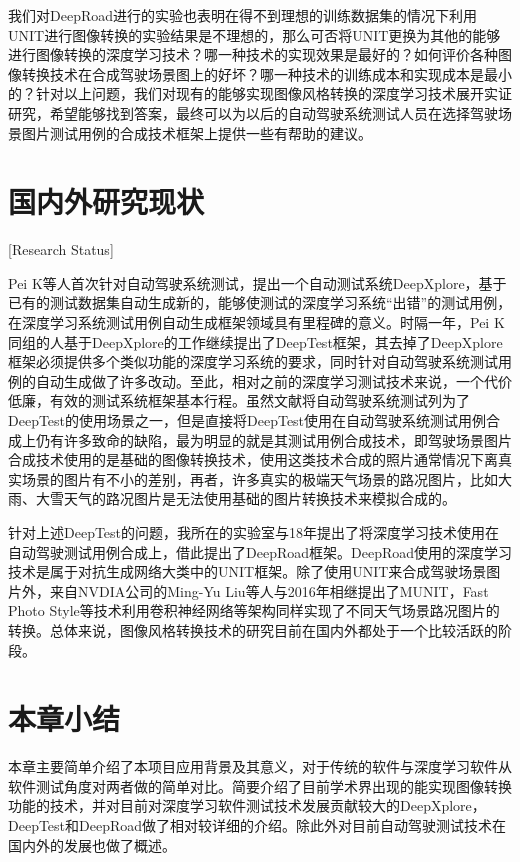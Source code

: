 我们对DeepRoad进行的实验也表明在得不到理想的训练数据集的情况下利用UNIT进行图像转换的实验结果是不理想的，那么可否将UNIT更换为其他的能够进行图像转换的深度学习技术？哪一种技术的实现效果是最好的？如何评价各种图像转换技术在合成驾驶场景图上的好坏？哪一种技术的训练成本和实现成本是最小的？针对以上问题，我们对现有的能够实现图像风格转换的深度学习技术展开实证研究，希望能够找到答案，最终可以为以后的自动驾驶系统测试人员在选择驾驶场景图片测试用例的合成技术框架上提供一些有帮助的建议。


\section{国内外研究现状}[Research Status]

Pei K\cite{DeepXplore}等人首次针对自动驾驶系统测试，提出一个自动测试系统DeepXplore，基于已有的测试数据集自动生成新的，能够使测试的深度学习系统“出错”的测试用例，在深度学习系统测试用例自动生成框架领域具有里程碑的意义。时隔一年，Pei K同组的人基于DeepXplore的工作继续提出了DeepTest\cite{DeepTest}框架，其去掉了DeepXplore框架必须提供多个类似功能的深度学习系统的要求，同时针对自动驾驶系统测试用例的自动生成做了许多改动。至此，相对之前的深度学习测试技术来说，一个代价低廉，有效的测试系统框架基本行程。虽然文献\cite{DeepTest}将自动驾驶系统测试列为了DeepTest的使用场景之一，但是直接将DeepTest使用在自动驾驶系统测试用例合成上仍有许多致命的缺陷，最为明显的就是其测试用例合成技术，即驾驶场景图片合成技术使用的是基础的图像转换技术，使用这类技术合成的照片通常情况下离真实场景的图片有不小的差别，再者，许多真实的极端天气场景的路况图片，比如大雨、大雪天气的路况图片是无法使用基础的图片转换技术来模拟合成的。

针对上述DeepTest的问题，我所在的实验室与18年提出了将深度学习技术使用在自动驾驶测试用例合成上，借此提出了DeepRoad框架\cite{DeepRoad}。DeepRoad使用的深度学习技术是属于对抗生成网络大类中的UNIT\cite{UNIT}框架。除了使用UNIT来合成驾驶场景图片外，来自NVDIA公司的Ming-Yu Liu等人与2016年相继提出了MUNIT\cite{MUNIT}，Fast Photo Style\cite{fps}等技术利用卷积神经网络等架构同样实现了不同天气场景路况图片的转换。总体来说，图像风格转换技术的研究目前在国内外都处于一个比较活跃的阶段。

\section{本章小结}

本章主要简单介绍了本项目应用背景及其意义，对于传统的软件与深度学习软件从软件测试角度对两者做的简单对比。简要介绍了目前学术界出现的能实现图像转换功能的技术，并对目前对深度学习软件测试技术发展贡献较大的DeepXplore，DeepTest和DeepRoad做了相对较详细的介绍。除此外对目前自动驾驶测试技术在国内外的发展也做了概述。

